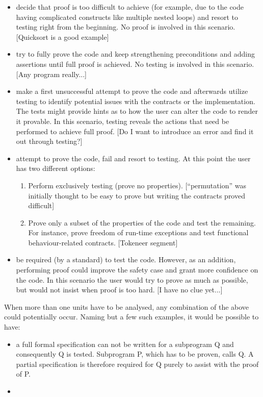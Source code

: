 \documentclass{article}
\begin{document}
\begin {itemize}
  \item decide that proof is too difficult to achieve (for example, due
    to the code having complicated constructs like multiple nested
    loops) and resort to testing right from the beginning. No proof
    is involved in this scenario. [Quicksort is a good example]

  \item try to fully prove the code and keep strengthening preconditions
    and adding assertions until full proof is achieved. No testing is
    involved in this scenario. [Any program really...]

  \item make a first unsuccessful attempt to prove the code and afterwards
    utilize testing to identify potential issues with the contracts or
    the implementation. The tests might provide hints as to how the user
    can alter the code to render it provable. In this scenario, testing
    reveals the actions that need be performed to achieve full proof.
    [Do I want to introduce an error and find it out through testing?]

  \item attempt to prove the code, fail and resort to testing. At this
    point the user has two different options:

    \begin{enumerate}
      \item Perform exclusively testing (prove no properties).
        [``permutation'' was initially thought to be easy to prove but writing
        the contracts proved difficult]

      \item Prove only a subset of the properties of the code and
        test the remaining. For instance, prove freedom of run-time
        exceptions and test functional behaviour-related contracts.
        [Tokeneer segment]
    \end{enumerate}

  \item be required (by a standard) to test the code. However, as an addition,
    performing proof could improve the safety case and grant more confidence on the
    code. In this scenario the user would try to prove as much as possible, but would
    not insist when proof is too hard.
    [I have no clue yet...]
\end{itemize}

When more than one units have to be analysed, any combination of the above could
potentially occur. Naming but a few such examples, it would be possible to have:
\begin{itemize}
  \item a full formal specification can not be written for a subprogram Q
    and consequently Q is tested. Subprogram P, which has to be proven, calls Q.
    A partial specification is therefore required for Q purely to assist with the
    proof of P.

  \item
\end{itemize}
\end{document}
